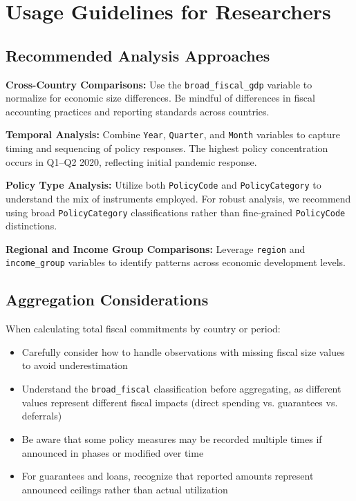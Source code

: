 \section{Usage Guidelines for Researchers}

\subsection{Recommended Analysis Approaches}

\textbf{Cross-Country Comparisons:} Use the \texttt{broad\_fiscal\_gdp} variable to normalize for economic size differences. Be mindful of differences in fiscal accounting practices and reporting standards across countries.

\textbf{Temporal Analysis:} Combine \texttt{Year}, \texttt{Quarter}, and \texttt{Month} variables to capture timing and sequencing of policy responses. The highest policy concentration occurs in Q1--Q2 2020, reflecting initial pandemic response.

\textbf{Policy Type Analysis:} Utilize both \texttt{PolicyCode} and \texttt{PolicyCategory} to understand the mix of instruments employed. For robust analysis, we recommend using broad \texttt{PolicyCategory} classifications rather than fine-grained \texttt{PolicyCode} distinctions.

\textbf{Regional and Income Group Comparisons:} Leverage \texttt{region} and \texttt{income\_group} variables to identify patterns across economic development levels.

\subsection{Aggregation Considerations}

When calculating total fiscal commitments by country or period:

\begin{itemize}
\item Carefully consider how to handle observations with missing fiscal size values to avoid underestimation
\item Understand the \texttt{broad\_fiscal} classification before aggregating, as different values represent different fiscal impacts (direct spending vs. guarantees vs. deferrals)
\item Be aware that some policy measures may be recorded multiple times if announced in phases or modified over time
\item For guarantees and loans, recognize that reported amounts represent announced ceilings rather than actual utilization
\end{itemize}

